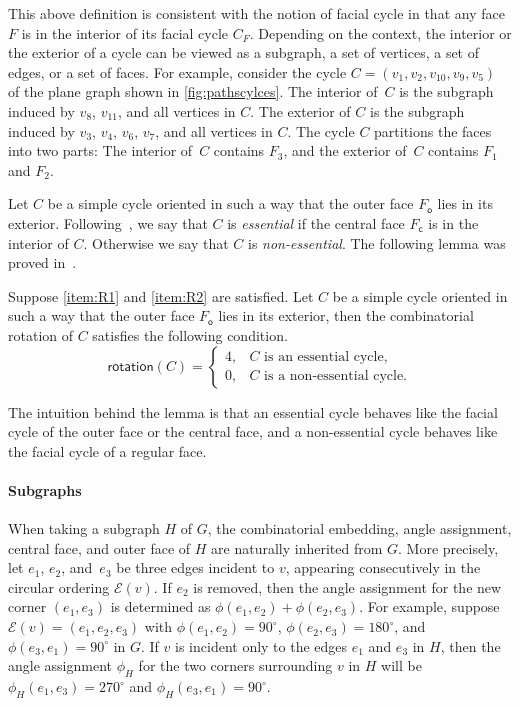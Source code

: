 \documentclass{article}\usepackage[a4paper,margin=20mm]{geometry}
\newcommand{\EE}{\mathcal{E}}
\newcommand{\FC}{F_\mathsf{c}}
\newcommand{\FO}{F_\mathsf{o}}
\newcommand{\rotation}{\mathsf{rotation}}
\begin{document}
This above definition is consistent with the notion of facial cycle in that any face $F$ is in the interior of its facial cycle $C_F$.
Depending on the context, the interior or the exterior of a cycle can be viewed as a subgraph, a set of vertices, a set of edges, or a set of faces. For example, consider the cycle $C=(v_1, v_2, v_{10}, v_9, v_5)$ of the plane graph shown in \cref{fig:pathscylces}. The interior of~$C$ is the subgraph induced by $v_8$, $v_{11}$, and all vertices in $C$. The exterior of $C$ is the subgraph induced by $v_3$, $v_{4}$, $v_6$, $v_7$, and all vertices in $C$. The cycle $C$ partitions the faces into two parts: The interior of~$C$ contains $F_3$, and the exterior of~$C$ contains $F_1$ and $F_2$.


Let $C$ be a simple cycle oriented in such a way that the outer face $\FO$ lies in its exterior.
Following~\cite{barth2023topology}, we say that  $C$ is \emph{essential} if the central face $\FC$ is in the interior  of $C$. Otherwise we say that  $C$ is \emph{non-essential}. The following lemma was proved in~\cite{barth2023topology}. 

\begin{lemma}\label{lem-prelim-cycle}
Suppose \ref{item:R1} and \ref{item:R2} are satisfied.
Let $C$ be a simple cycle oriented in such a way that the outer face $\FO$ lies in its exterior, then the combinatorial rotation of $C$ satisfies the following condition.
\[\rotation(C)=\begin{cases}
			4, & \text{$C$ is an essential cycle,}\\
            0, & \text{$C$ is a non-essential cycle.}
		 \end{cases}\]
\end{lemma}

The intuition behind the lemma is that an essential cycle behaves like the facial cycle of the outer face or the central face, and a non-essential cycle behaves like the facial cycle of a regular face.

\paragraph{Subgraphs} When taking a subgraph $H$ of $G$, the combinatorial embedding, angle assignment, central face, and outer face of $H$ are naturally inherited from $G$. More precisely, let $e_1$, $e_2$, and~$e_3$ be three edges incident to $v$, appearing consecutively in the circular ordering $\EE(v)$. If $e_2$ is removed, then the angle assignment for the new corner $(e_1, e_3)$ is determined as  $\phi(e_1, e_2) + \phi(e_2, e_3)$. For example, suppose $\EE(v) = (e_1, e_2, e_3)$ with $\phi(e_1, e_2) = 90^\circ$,  $\phi(e_2, e_3) = 180^\circ$, and $\phi(e_3, e_1) = 90^\circ$ in $G$. If $v$ is incident only to the edges $e_1$ and $e_3$ in $H$, then the angle assignment $\phi_H$ for the two corners surrounding $v$ in $H$ will be  $\phi_H(e_1, e_3) = 270^\circ$ and $\phi_H(e_3, e_1) = 90^\circ$. 
\end{document}

